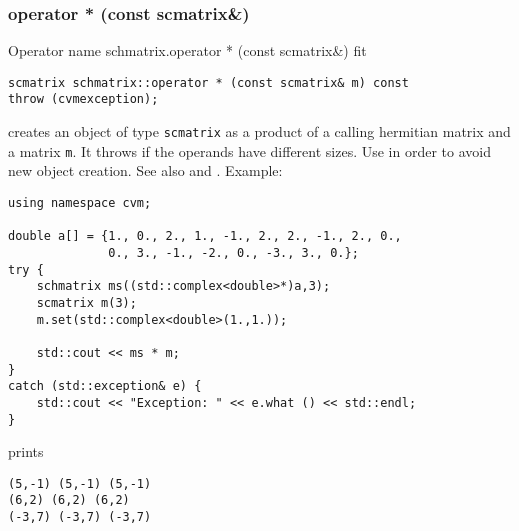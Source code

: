 \subsubsection{operator * (const scmatrix\&)}
Operator%
\pdfdest name {schmatrix.operator * (const scmatrix&)} fit
\begin{verbatim}
scmatrix schmatrix::operator * (const scmatrix& m) const
throw (cvmexception);
\end{verbatim}
creates an object of type \verb"scmatrix"
as a product of a calling hermitian matrix and a matrix \verb"m".
It throws  
if the operands have different sizes.
Use  in order to avoid
 new object creation.
See also
 and .
Example:
\begin{Verbatim}
using namespace cvm;

double a[] = {1., 0., 2., 1., -1., 2., 2., -1., 2., 0.,
              0., 3., -1., -2., 0., -3., 3., 0.};
try {
    schmatrix ms((std::complex<double>*)a,3);
    scmatrix m(3);
    m.set(std::complex<double>(1.,1.));

    std::cout << ms * m;
}
catch (std::exception& e) {
    std::cout << "Exception: " << e.what () << std::endl;
}
\end{Verbatim}
prints
\begin{Verbatim}
(5,-1) (5,-1) (5,-1)
(6,2) (6,2) (6,2)
(-3,7) (-3,7) (-3,7)
\end{Verbatim}
\newpage





